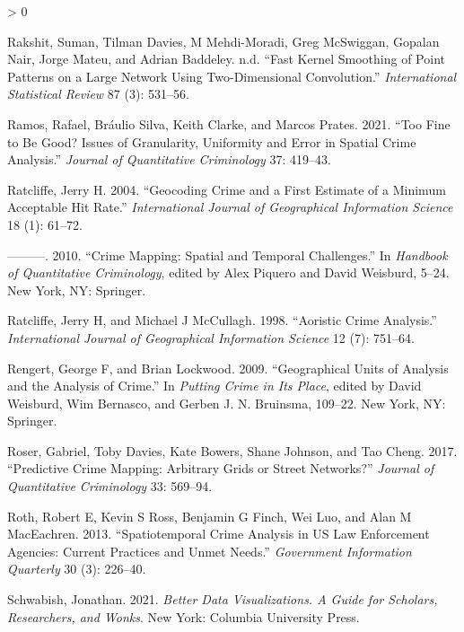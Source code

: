 \documentclass[
  krantz2]{krantz}
\newlength{\cslhangindent}
\newenvironment{CSLReferences}[2] %
 {%
  \setlength{\parindent}{0pt}
  \ifodd #1 \everypar{\setlength{\hangindent}{\cslhangindent}}\ignorespaces\fi
  \ifnum #2 > 0
  \setlength{\parskip}{#2\baselineskip}
  \fi
 }%
 {}
\begin{document}
\begin{CSLReferences}{1}{0}
\leavevmode\hypertarget{ref-Rakshit_2019}{}%
Rakshit, Suman, Tilman Davies, M Mehdi-Moradi, Greg McSwiggan, Gopalan Nair, Jorge Mateu, and Adrian Baddeley. n.d. {``Fast Kernel Smoothing of Point Patterns on a Large Network Using Two-Dimensional Convolution.''} \emph{International Statistical Review} 87 (3): 531--56.

\leavevmode\hypertarget{ref-Ramos_2021}{}%
Ramos, Rafael, Bráulio Silva, Keith Clarke, and Marcos Prates. 2021. {``Too Fine to Be Good? Issues of Granularity, Uniformity and Error in Spatial Crime Analysis.''} \emph{Journal of Quantitative Criminology} 37: 419--43.

\leavevmode\hypertarget{ref-Ratcliffe_2004}{}%
Ratcliffe, Jerry H. 2004. {``Geocoding Crime and a First Estimate of a Minimum Acceptable Hit Rate.''} \emph{International Journal of Geographical Information Science} 18 (1): 61--72.

\leavevmode\hypertarget{ref-Ratcliffe_2010}{}%
---------. 2010. {``Crime Mapping: Spatial and Temporal Challenges.''} In \emph{Handbook of Quantitative Criminology}, edited by Alex Piquero and David Weisburd, 5--24. New York, NY: Springer.

\leavevmode\hypertarget{ref-Ratcliffe_1998}{}%
Ratcliffe, Jerry H, and Michael J McCullagh. 1998. {``Aoristic Crime Analysis.''} \emph{International Journal of Geographical Information Science} 12 (7): 751--64.

\leavevmode\hypertarget{ref-Rengert_2009}{}%
Rengert, George F, and Brian Lockwood. 2009. {``Geographical Units of Analysis and the Analysis of Crime.''} In \emph{Putting Crime in Its Place}, edited by David Weisburd, Wim Bernasco, and Gerben J. N. Bruinsma, 109--22. New York, NY: Springer.

\leavevmode\hypertarget{ref-Rosser_2017}{}%
Roser, Gabriel, Toby Davies, Kate Bowers, Shane Johnson, and Tao Cheng. 2017. {``Predictive Crime Mapping: Arbitrary Grids or Street Networks?''} \emph{Journal of Quantitative Criminology} 33: 569--94.

\leavevmode\hypertarget{ref-Roth_2013}{}%
Roth, Robert E, Kevin S Ross, Benjamin G Finch, Wei Luo, and Alan M MacEachren. 2013. {``Spatiotemporal Crime Analysis in US Law Enforcement Agencies: Current Practices and Unmet Needs.''} \emph{Government Information Quarterly} 30 (3): 226--40.

\leavevmode\hypertarget{ref-Schwabish_2021}{}%
Schwabish, Jonathan. 2021. \emph{Better Data Visualizations. A Guide for Scholars, Researchers, and Wonks}. New York: Columbia University Press.


\end{CSLReferences}
\end{document}
